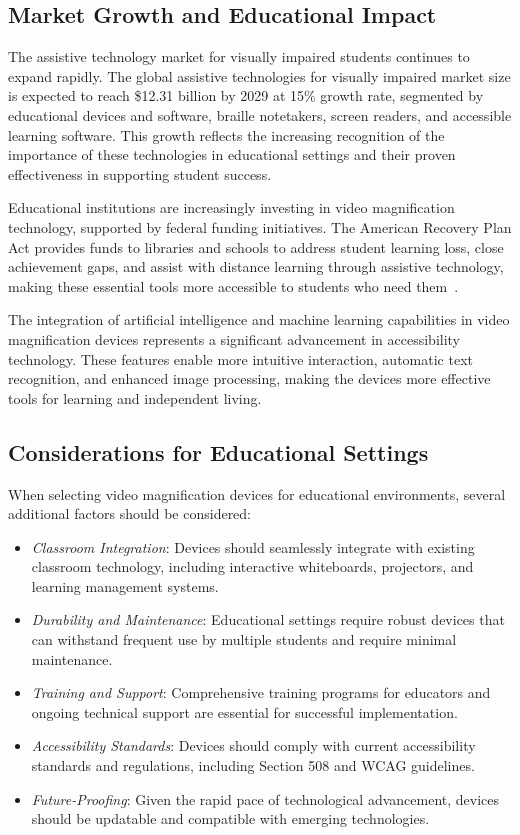 \subsection{Market Growth and Educational Impact}

The assistive technology market for visually impaired students continues to expand rapidly. The global assistive technologies for visually impaired market size is expected to reach \$12.31 billion by 2029 at 15\% growth rate, segmented by educational devices and software, braille notetakers, screen readers, and accessible learning software. This growth reflects the increasing recognition of the importance of these technologies in educational settings and their proven effectiveness in supporting student success.

Educational institutions are increasingly investing in video magnification technology, supported by federal funding initiatives. The American Recovery Plan Act provides funds to libraries and schools to address student learning loss, close achievement gaps, and assist with distance learning through assistive technology, making these essential tools more accessible to students who need them~\cite{AmericanRecoveryAct}.

The integration of artificial intelligence and machine learning capabilities in video magnification devices represents a significant advancement in accessibility technology. These features enable more intuitive interaction, automatic text recognition, and enhanced image processing, making the devices more effective tools for learning and independent living.

\subsection{Considerations for Educational Settings}

When selecting video magnification devices for educational environments, several additional factors should be considered:

\begin{itemize}
 \item \emph{Classroom Integration}: Devices should seamlessly integrate with existing classroom technology, including interactive whiteboards, projectors, and learning management systems.
 \item \emph{Durability and Maintenance}: Educational settings require robust devices that can withstand frequent use by multiple students and require minimal maintenance.
 \item \emph{Training and Support}: Comprehensive training programs for educators and ongoing technical support are essential for successful implementation.
 \item \emph{Accessibility Standards}: Devices should comply with current accessibility standards and regulations, including Section 508 and WCAG guidelines.
 \item \emph{Future-Proofing}: Given the rapid pace of technological advancement, devices should be updatable and compatible with emerging technologies.
\end{itemize}

